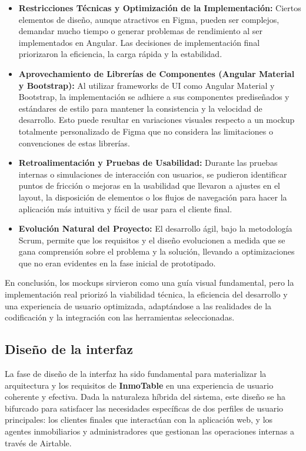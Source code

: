 \begin{itemize}
    \item \textbf{Restricciones Técnicas y Optimización de la Implementación:} Ciertos elementos de diseño, aunque atractivos en Figma, pueden ser complejos, demandar mucho tiempo o generar problemas de rendimiento al ser implementados en Angular. Las decisiones de implementación final priorizaron la eficiencia, la carga rápida y la estabilidad.

    \item \textbf{Aprovechamiento de Librerías de Componentes (Angular Material y Bootstrap):} Al utilizar frameworks de UI como Angular Material y Bootstrap, la implementación se adhiere a sus componentes prediseñados y estándares de estilo para mantener la consistencia y la velocidad de desarrollo. Esto puede resultar en variaciones visuales respecto a un mockup totalmente personalizado de Figma que no considera las limitaciones o convenciones de estas librerías.

    \item \textbf{Retroalimentación y Pruebas de Usabilidad:} Durante las pruebas internas o simulaciones de interacción con usuarios, se pudieron identificar puntos de fricción o mejoras en la usabilidad que llevaron a ajustes en el layout, la disposición de elementos o los flujos de navegación para hacer la aplicación más intuitiva y fácil de usar para el cliente final.

    \item \textbf{Evolución Natural del Proyecto:} El desarrollo ágil, bajo la metodología Scrum, permite que los requisitos y el diseño evolucionen a medida que se gana comprensión sobre el problema y la solución, llevando a optimizaciones que no eran evidentes en la fase inicial de prototipado.
\end{itemize}

En conclusión, los mockups sirvieron como una guía visual fundamental, pero la implementación real priorizó la viabilidad técnica, la eficiencia del desarrollo y una experiencia de usuario optimizada, adaptándose a las realidades de la codificación y la integración con las herramientas seleccionadas.


\subsection{Diseño de la interfaz}

La fase de diseño de la interfaz ha sido fundamental para materializar la arquitectura y los requisitos de \textbf{InmoTable} en una experiencia de usuario coherente y efectiva. Dada la naturaleza híbrida del sistema, este diseño se ha bifurcado para satisfacer las necesidades específicas de dos perfiles de usuario principales: los clientes finales que interactúan con la aplicación web, y los agentes inmobiliarios y administradores que gestionan las operaciones internas a través de Airtable.

